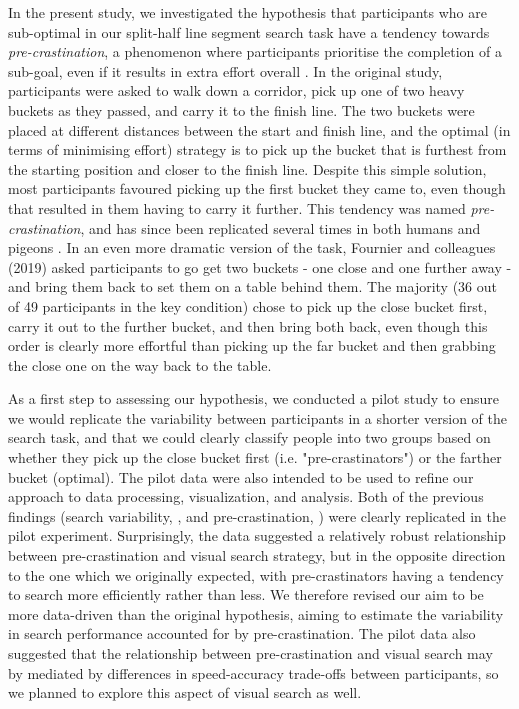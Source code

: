 \documentclass[]{rsos}
\begin{document}
In the present study, we investigated the hypothesis that participants who are sub-optimal in our split-half line segment search task have a tendency towards \textit{pre-crastination}, a phenomenon where participants prioritise the completion of a sub-goal, even if it results in extra effort overall \cite{rosenbaum2014}. In the original study, participants were asked to walk down a corridor, pick up one of two heavy buckets as they passed, and carry it to the finish line. The two buckets were placed at different distances between the start and finish line, and the optimal (in terms of minimising effort) strategy is to pick up the bucket that is furthest from the starting position and closer to the finish line. Despite this simple solution, most participants favoured picking up the first bucket they came to, even though that resulted in them having to carry it further. This tendency was named \textit{pre-crastination}, and has since been replicated several times in both humans \cite{fournier2019task} and pigeons \cite{wasserman2015}. In an even more dramatic version of the task, Fournier and colleagues (2019) asked participants to go get two buckets - one close and one further away - and bring them back to set them on a table behind them. The majority (36 out of 49 participants in the key condition) chose to pick up the close bucket first, carry it out to the further bucket, and then bring both back, even though this order is clearly more effortful than picking up the far bucket and then grabbing the close one on the way back to the table.

As a first step to assessing our hypothesis, we conducted a pilot study to ensure we would replicate the variability between participants in a shorter version of the search task, and that we could clearly classify people into two groups based on whether they pick up the close bucket first (i.e. "pre-crastinators") or the farther bucket (optimal). The pilot data were also intended to be used to refine our approach to data processing, visualization, and analysis. Both of the previous findings (search variability, \cite{nowakowska2017}, and pre-crastination, \cite{fournier2019task}) were clearly replicated in the pilot experiment. Surprisingly, the data suggested a relatively robust relationship between pre-crastination and visual search strategy, but in the opposite direction to the one which we originally expected, with pre-crastinators having a tendency to search more efficiently rather than less. We therefore revised our aim to be more data-driven than the original hypothesis, aiming to estimate the variability in search performance accounted for by pre-crastination. The pilot data also suggested that the relationship between pre-crastination and visual search may by mediated by differences in speed-accuracy trade-offs between participants, so we planned to explore this aspect of visual search as well.  
\end{document}
